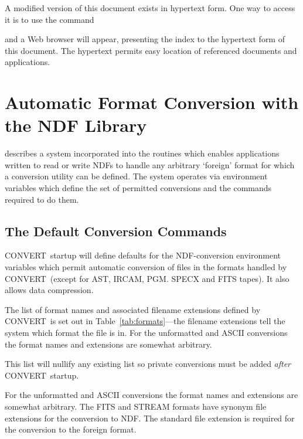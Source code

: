 \documentclass[twoside,11pt]{starlink}
\providecommand{\CONVERT}{{\footnotesize CONVERT}}
\begin{document}
A modified version of this document exists in hypertext form.  One way
to access it is to use the
 command

\begin{terminalv}
\end{terminalv}

and a Web browser will appear, presenting the index to the hypertext
form of this document.  The hypertext permits easy location of
referenced documents and applications.


\section{\label{sect_auto}Automatic Format Conversion with
the NDF Library}
 describes a system incorporated into the
routines which enables applications written to read or write NDFs to handle
any arbitrary `foreign' format for which a conversion utility can be defined.
The system operates via environment variables which define the set of permitted
conversions and the commands required to do them.

\subsection{The Default Conversion Commands}
\CONVERT\ startup will define defaults for the NDF-conversion environment
variables which permit automatic conversion of files in the formats handled by
\CONVERT\ (except for AST, IRCAM, PGM. SPECX and FITS tapes).
It also allows data compression.



\begin{latexonly}
The list of format names and associated filename extensions
defined by \CONVERT\ is set out in Table~\ref{tab:formats}---the filename
extensions tell the system which format the file is in. For the unformatted
and ASCII conversions the format names and extensions are somewhat arbitrary.
\end{latexonly}
This list will nullify any existing list so private conversions must be added
\emph{after} \CONVERT\ startup.

For the unformatted and ASCII conversions the format names and
extensions are somewhat arbitrary.  The FITS and STREAM formats have
synonym file extensions for the conversion to NDF.  The standard file
extension is required for the conversion to the foreign format.
\end{document}
